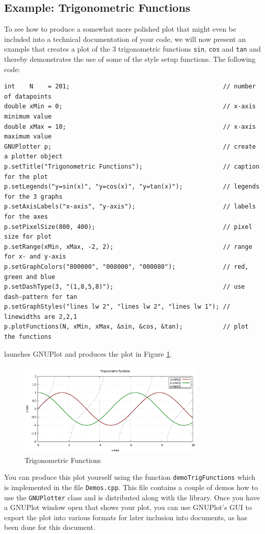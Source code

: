\documentclass[11pt]{article}
\begin{document}
\subsection{Example: Trigonometric Functions}
To see how to produce a somewhat more polished plot that might even be included into a technical documentation of your code, we will now present an example that creates a plot of the 3 trigonometric functions \texttt{sin}, \texttt{cos} and \texttt{tan} and thereby demonstrates the use of some of the style setup functions. The following code:
\begin{verbatim}
int    N    = 201;                                          // number of datapoints
double xMin = 0;                                            // x-axis minimum value
double xMax = 10;                                           // x-axis maximum value
GNUPlotter p;                                               // create a plotter object
p.setTitle("Trigonometric Functions");                      // caption for the plot
p.setLegends("y=sin(x)", "y=cos(x)", "y=tan(x)");           // legends for the 3 graphs
p.setAxisLabels("x-axis", "y-axis");                        // labels for the axes
p.setPixelSize(800, 400);                                   // pixel size for plot
p.setRange(xMin, xMax, -2, 2);                              // range for x- and y-axis
p.setGraphColors("800000", "008000", "000080");             // red, green and blue
p.setDashType(3, "(1,8,5,8)");                              // use dash-pattern for tan
p.setGraphStyles("lines lw 2", "lines lw 2", "lines lw 1"); // linewidths are 2,2,1
p.plotFunctions(N, xMin, xMax, &sin, &cos, &tan);           // plot the functions
\end{verbatim}
launches GNUPlot and produces the plot in Figure \ref{fig:TrigFunctions}.
\begin{figure}[h!]
	\centering
  	\includegraphics[width=0.80\textwidth]{Plots/TrigFunctions.pdf}
	\caption{Trigonometric Functions}
	\label{fig:TrigFunctions}
\end{figure}
\newline
You can produce this plot yourself using the function \texttt{demoTrigFunctions} which is implemented in the file \texttt{Demos.cpp}. This file contains a couple of demos how to use the \texttt{GNUPlotter} class and is distributed along with the library. Once you have a GNUPlot window open that shows your plot, you can use GNUPlot's GUI to export the plot into various formats for later inclusion into documents, as has been done for this document.
\end{document}
